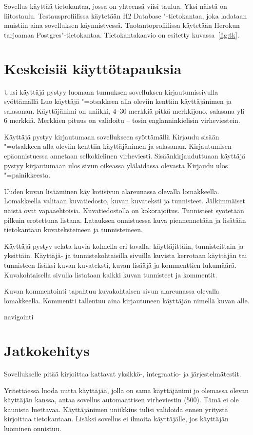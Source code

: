 \documentclass[finnish,colorlinks,headings=normal,parskip=half,footsepline]{scrartcl}
\begin{document}
Sovellus käyttää tietokantaa, jossa on yhteensä viisi taulua. Yksi näistä on liitostaulu. Testausprofiilissa käytetään H2 Database "-tietokantaa, joka ladataan muistiin aina sovelluksen käynnistyessä. Tuotantoprofiilissa käytetään Herokun tarjoamaa Postgres"-tietokantaa. Tietokantakaavio on esitetty kuvassa~\ref{fig:tk}.

\section{Keskeisiä käyttötapauksia}
Uusi käyttäjä pystyy luomaan tunnuksen sovelluksen kirjautumissivulla syöttämällä Luo käyttäjä "=otsakkeen alla oleviin kenttiin käyttäjänimen ja salasanan. Käyttäjänimi on uniikki, 4--30 merkkiä pitkä merkkijono, salasana yli 6 merkkiä. Merkkien pituus on validoitu -- tosin englanninkielisin virheviestein.

Käyttäjä pystyy kirjautumaan sovellukseen syöttämällä Kirjaudu sisään "=otsakkeen alla oleviin kenttiin käyttäjänimen ja salasanan. Kirjautumisen epäonnistuessa annetaan selkokielinen virheviesti. Sisäänkirjauduttuaan käyttäjä pystyy kirjautumaan ulos sivun oikeassa ylälaidassa olevasta Kirjaudu ulos "=painikkeesta.

Uuden kuvan lisääminen käy kotisivun alareunassa olevalla lomakkeella. Lomakkeella valitaan kuvatiedosto, kuvan kuvateksti ja tunnisteet. Jälkimmäiset näistä ovat vapaaehtoisia. Kuvatiedostolla on kokorajoitus. Tunnisteet syötetään pilkuin erotettuna listana. Latauksen onnistuessa kuva piennennetään ja lisätään tietokantaan kuvateksteineen ja tunnisteineen.

Käyttäjä pystyy selata kuvia kolmella eri tavalla: käyttäjittäin, tunnisteittain ja yksittäin. Käyttäjä- ja tunnistekohtaisilla sivuilla kuvista kerrotaan käyttäjän tai tunnisteen lisäksi kuvan kuvateksti, kuvan lisääjä ja kommenttien lukumäärä. Kuvakohtaisella sivulla listataan kaikki kuvan tunnisteet ja kommentit.

Kuvan kommentointi tapahtuu kuvakohtaisen sivun alareunassa olevalla lomakkeella. Kommentti tallentuu aina kirjautuneen käyttäjän nimellä kuvan alle.

navigointi

\section{Jatkokehitys}
Sovellukselle pitää kirjoittaa kattavat yksikkö-, integraatio- ja järjestelmätestit.

Yritettäessä luoda uutta käyttäjää, jolla on sama käyttäjänimi jo olemassa olevan käyttäjän kanssa, antaa sovellus automaattisen virheviestin (500). Tämä ei ole kaunista luettavaa. Käyttäjänimen uniikkius tulisi validoida ennen yritystä kirjoittaa tietokantaan. Lisäksi sovellus ei ilmoita käyttäjälle, jos käyttäjän luominen onnistuu.
\end{document}
